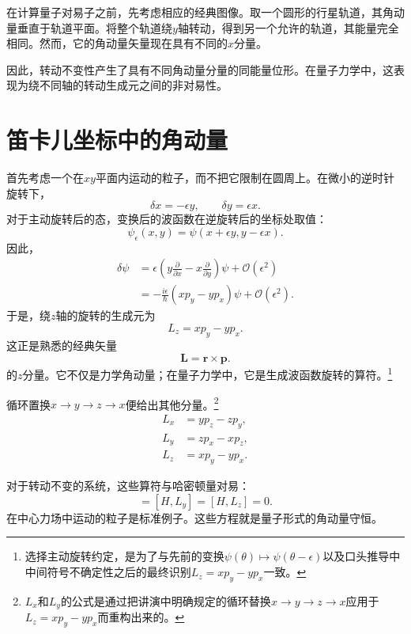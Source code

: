 在计算量子对易子之前，先考虑相应的经典图像。取一个圆形的行星轨道，其角动量垂直于轨道平面。将整个轨道绕\(y\)轴转动，得到另一个允许的轨道，其能量完全相同。然而，它的角动量矢量现在具有不同的\(x\)分量。

因此，转动不变性产生了具有不同角动量分量的同能量位形。在量子力学中，这表现为绕不同轴的转动生成元之间的非对易性。

\section{笛卡儿坐标中的角动量}

首先考虑一个在\(xy\)平面内运动的粒子，而不把它限制在圆周上。在微小的逆时针旋转下，
\begin{equation}
\delta x=-\epsilon y,
\qquad
\delta y=\epsilon x.
\end{equation}
对于主动旋转后的态，变换后的波函数在逆旋转后的坐标处取值：
\begin{equation}
\psi_\epsilon(x,y)
=\psi(x+\epsilon y,y-\epsilon x).
\end{equation}
因此，
\begin{align}
\delta\psi
&=\epsilon\left(
y\frac{\partial}{\partial x}
-x\frac{\partial}{\partial y}
\right)\psi
+\mathcal O(\epsilon^2)\\
&=-\frac{i\epsilon}{\hbar}
\left(xp_y-yp_x\right)\psi
+\mathcal O(\epsilon^2).
\end{align}
于是，绕\(z\)轴的旋转的生成元为
\begin{equation}
L_z=xp_y-yp_x.
\end{equation}
这正是熟悉的经典矢量
\begin{equation}
\mathbf L=\mathbf r\times\mathbf p.
\end{equation}
的\(z\)分量。它不仅是力学角动量；在量子力学中，它是生成波函数旋转的算符。\footnote{选择主动旋转约定，是为了与先前的变换\(\psi(\theta)\mapsto\psi(\theta-\epsilon)\)以及口头推导中中间符号不确定性之后的最终识别\(L_z=xp_y-yp_x\)一致。}

循环置换\(x\to y\to z\to x\)便给出其他分量。\footnote{\(L_x\)和\(L_y\)的公式是通过把讲演中明确规定的循环替换\(x\to y\to z\to x\)应用于\(L_z=xp_y-yp_x\)而重构出来的。}
\begin{align}
L_x&=yp_z-zp_y,\\
L_y&=zp_x-xp_z,\\
L_z&=xp_y-yp_x.
\end{align}

对于转动不变的系统，这些算符与哈密顿量对易：
\begin{equation}
[H,L_x]=[H,L_y]=[H,L_z]=0.
\end{equation}
在中心力场中运动的粒子是标准例子。这些方程就是量子形式的角动量守恒。

